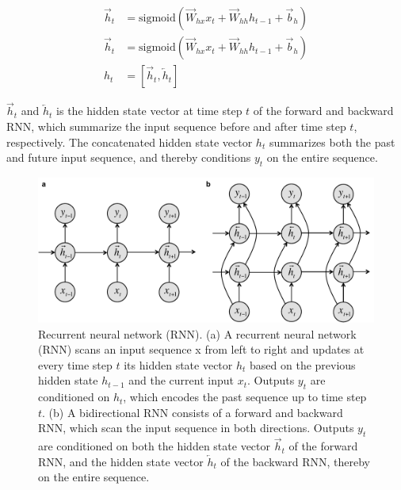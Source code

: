 \begin{align}
  \overrightarrow{h}_t&=\textrm{sigmoid}(\overrightarrow{W}_{hx}x_t+\overrightarrow{W}_{hh}h_{t-1}+\overrightarrow{b}_h) \\
  \overrightarrow{h}_t&=\textrm{sigmoid}(\overrightarrow{W}_{hx}x_t+\overrightarrow{W}_{hh}h_{t-1}+\overrightarrow{b}_h) \\
  h_t&=[\overrightarrow{h}_t, \overleftarrow{h}_t]
\end{align}

$\overrightarrow{h}_t$ and $\overleftarrow{h}_t$ is the hidden state vector at time step $t$ of the forward and backward RNN, which summarize the input sequence before and after time step $t$, respectively. The concatenated hidden state vector $h_t$ summarizes both the past and future input sequence, and thereby conditions $y_t$ on the entire sequence.

\begin{figure}[htbp!]
\centering
\includegraphics[width=1.0\textwidth]{rnn}
\caption[Recurrent neural network (RNN).]{Recurrent neural network (RNN). (a) A recurrent neural network (RNN) scans an input sequence x from left to right and updates at every time step $t$ its hidden state vector $h_t$ based on the previous hidden state $h_{t-1}$ and the current input $x_t$. Outputs $y_t$ are conditioned on $h_t$, which encodes the past sequence up to time step $t$. (b) A bidirectional RNN consists of a forward and backward RNN, which scan the input sequence in both directions. Outputs $y_t$ are conditioned on both the hidden state vector $\overrightarrow{h}_t$ of the forward RNN, and the hidden state vector $\overleftarrow{h}_t$ of the backward RNN, thereby on the entire sequence.}
\label{fig:rnn}
\end{figure}


